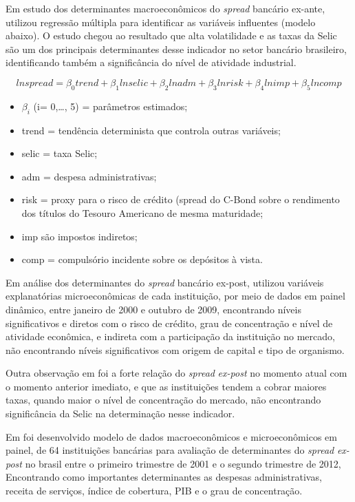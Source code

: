 \documentclass[12pt,openright,oneside,a4paper,chapter=TITLE,section=TITLE,subsection=Title,english,french,spanish,portugues,sumario=tradicional]{04-class-files/abntex2}
\providecommand{\tightlist}{%
  \setlength{\itemsep}{0pt}\setlength{\parskip}{0pt}}
\begin{document}
Em estudo dos determinantes macroeconômicos do \emph{spread} bancário ex-ante, \textcite{oreiro-2006} utilizou regressão múltipla para identificar as variáveis influentes (modelo abaixo). O estudo chegou ao resultado que alta volatilidade e as taxas da Selic são um dos principais determinantes desse indicador no setor bancário brasileiro, identificando também a significância do nível de atividade industrial.

\[
ln spread = \beta_0 trend + \beta_1 ln selic + \beta_2 ln adm + \beta_3 ln risk + \beta_4 ln imp + \beta_5 ln comp
\]

\begin{itemize}
\tightlist
\item
  \(\beta_i\) (i= 0,\ldots{}, 5) = parâmetros estimados;
\item
  trend = tendência determinista que controla outras variáveis;
\item
  selic = taxa Selic;
\item
  adm = despesa administrativas;
\item
  risk = proxy para o risco de crédito (spread do C-Bond sobre o rendimento dos títulos do Tesouro Americano de mesma maturidade;
\item
  imp são impostos indiretos;
\item
  comp = compulsório incidente sobre os depósitos à vista.
\end{itemize}

Em análise dos determinantes do \emph{spread} bancário ex-post,
\textcite{dantas:2012} utilizou variáveis explanatórias microeconômicas de cada
instituição, por meio de dados em painel dinâmico, entre janeiro de 2000 e
outubro de 2009, encontrando níveis significativos e diretos com o risco de
crédito, grau de concentração e nível de atividade econômica, e indireta com a
participação da instituição no mercado, não encontrando níveis significativos
com origem de capital e tipo de organismo.

Outra observação em \textcite{dantas:2012} foi a forte relação do \emph{spread}
\emph{ex-post} no momento atual com o momento anterior imediato, e que as
instituições tendem a cobrar maiores taxas, quando maior o nível de
concentração do mercado, não encontrando significância da Selic na determinação
nesse indicador.

Em \textcite{almeida:2013} foi desenvolvido modelo de dados macroeconômicos e
microeconômicos em painel, de 64 instituições bancárias para avaliação de
determinantes do \emph{spread} \emph{ex-post} no brasil entre o primeiro trimestre de
2001 e o segundo trimestre de 2012, Encontrando como importantes determinantes
as despesas administrativas, receita de serviços, índice de cobertura, PIB e o
grau de concentração.
\end{document}
